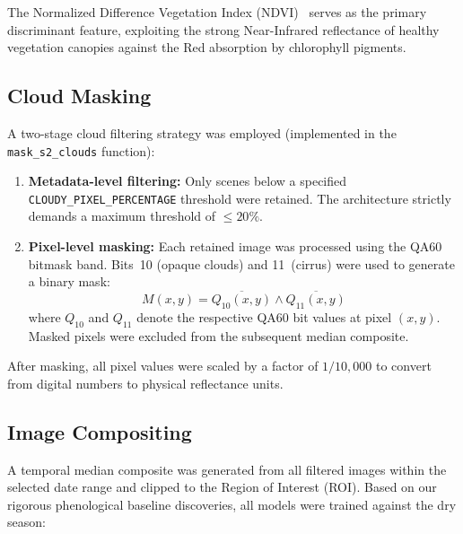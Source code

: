 \documentclass[12pt, a4paper, twocolumn]{article}
\begin{document}
The Normalized Difference Vegetation Index (NDVI)~\cite{rouse1974monitoring} serves as the primary discriminant feature, exploiting the strong Near-Infrared reflectance of healthy vegetation canopies against the Red absorption by chlorophyll pigments.

\subsection{Cloud Masking}

A two-stage cloud filtering strategy was employed (implemented in the \texttt{mask\_s2\_clouds} function):

\begin{enumerate}[label=\arabic*.]
    \item \textbf{Metadata-level filtering:} Only scenes below a specified \texttt{CLOUDY\_PIXEL\_PERCENTAGE} threshold were retained.
The architecture strictly demands a maximum threshold of $\leq 20\%$.
    \item \textbf{Pixel-level masking:} Each retained image was processed using the QA60 bitmask band.
Bits~10 (opaque clouds) and 11~(cirrus) were used to generate a binary mask:
    \begin{equation}
        M(x,y) = \overline{Q_{10}(x,y)} \wedge \overline{Q_{11}(x,y)}
    \end{equation}
    where $Q_{10}$ and $Q_{11}$ denote the respective QA60 bit values at pixel $(x,y)$.
Masked pixels were excluded from the subsequent median composite.
\end{enumerate}

After masking, all pixel values were scaled by a factor of $1/10{,}000$ to convert from digital numbers to physical reflectance units.

\subsection{Image Compositing}

A temporal median composite was generated from all filtered images within the selected date range and clipped to the Region of Interest (ROI).
Based on our rigorous phenological baseline discoveries, all models were trained against the dry season:

\begin{table}[H]
\centering
\caption{Date ranges and cloud thresholds per classifier notebook.}
\label{tab:dates}
\end{table}
\end{document}
